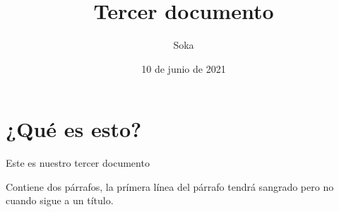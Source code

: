 \documentclass[a4paper,11pt]{article}
\begin{document}
	\title{Tercer documento}
	\author{Soka}
	\date{10 de junio de 2021}
	\maketitle

	\section{¿Qué es esto?}
		Este es nuestro tercer documento


		Contiene dos párrafos, la prímera línea del párrafo tendrá sangrado pero no cuando sigue a un título.

\end{document}
